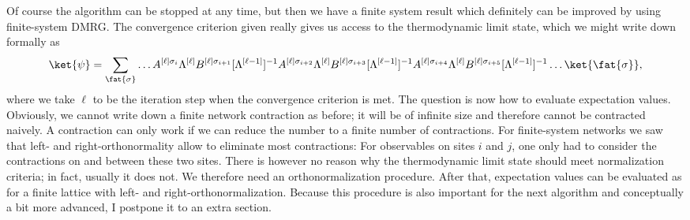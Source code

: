 Of course the algorithm can be stopped at any time, but then we have a finite system result which definitely can be improved by using finite-system DMRG. The convergence criterion given really gives us access to the thermodynamic limit state, which we might write down formally as
\begin{equation}
\ket{\psi} = \sum_{\fat{\sigma}} \ldots A^{[\ell]\sigma_i}\Lambda^{[\ell]} B^{[\ell]\sigma_{i+1}} [\Lambda^{[\ell-1]}]^{-1}A^{[\ell]\sigma_{i+2}}\Lambda^{[\ell]} B^{[\ell]\sigma_{i+3}} [\Lambda^{[\ell-1]}]^{-1}A^{[\ell]\sigma_{i+4}}\Lambda^{[\ell]} B^{[\ell]\sigma_{i+5}} [\Lambda^{[\ell-1]}]^{-1} \ldots 
 \ket{\fat{\sigma}} ,
\end{equation}
where we take $\ell$ to be the iteration step when the convergence criterion is met. The question is now how to evaluate expectation values. Obviously, we cannot write down a finite network contraction as before; it will be of infinite size and therefore cannot be contracted naively. A contraction can only work if we can reduce the number to a finite number of contractions. For finite-system networks we saw that left- and right-orthonormality allow to eliminate most contractions: For observables on sites $i$ and $j$, one only had to consider the contractions on and between these two sites. There is however no reason why the thermodynamic limit state should meet normalization criteria; in fact, usually it does not. We therefore need an orthonormalization procedure. After that, expectation values can be evaluated as for a finite lattice with left- and right-orthonormalization. Because this procedure is also important for the next algorithm and conceptually a bit more advanced, I postpone it to an extra section. 

